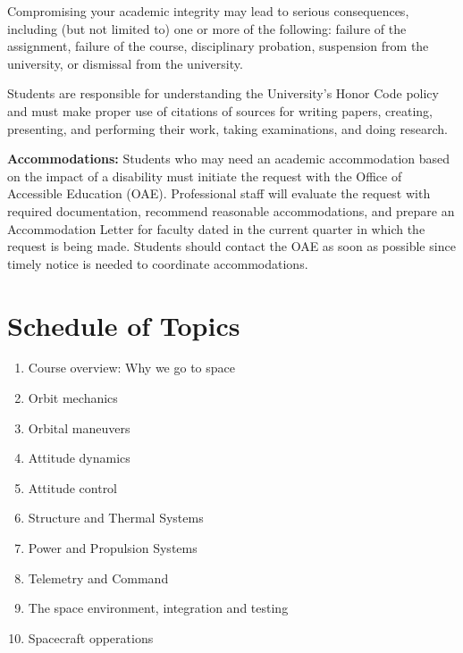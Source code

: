 \documentclass[11pt,letterpaper]{article}
\begin{document}
Compromising your academic integrity may lead to serious consequences, including (but not limited to) one or more of the following: failure of the assignment, failure of the course, disciplinary probation, suspension from the university, or dismissal from the university.

Students are responsible for understanding the University's Honor Code policy and must make proper use of citations of sources for writing papers, creating, presenting, and performing their work, taking examinations, and doing research.

\medskip
\noindent
\textbf{Accommodations:} Students who may need an academic accommodation based on the impact of a disability must initiate the request with the Office of Accessible Education (OAE). Professional staff will evaluate the request with required documentation, recommend reasonable accommodations, and prepare an Accommodation Letter for faculty dated in the current quarter in which the request is being made. Students should contact the OAE as soon as possible since timely notice is needed to coordinate accommodations.


\section*{Schedule of Topics}

\begin{enumerate}[label=\textbf{Week \arabic*:},leftmargin=3.5\parindent]
	\item Course overview: Why we go to space
	\item Orbit mechanics
	\item Orbital maneuvers
	\item Attitude dynamics
	\item Attitude control
	\item Structure and Thermal Systems
	\item Power and Propulsion Systems
	\item Telemetry and Command
	\item The space environment, integration and testing
	\item Spacecraft opperations
\end{enumerate}
\end{document}
